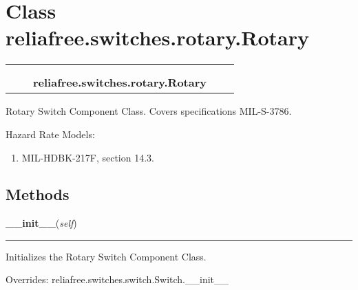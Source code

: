 %
%
%


\section{Class reliafree.switches.rotary.Rotary}

    \label{reliafree:switches:rotary:Rotary}
\begin{tabular}{cccccc}
\multicolumn{2}{r}{\settowidth{\BCL}{reliafree.switches.switch.Switch}\multirow{2}{\BCL}{reliafree.switches.switch.Switch}}
&&
  \\\cline{3-3}
  &&\multicolumn{1}{c|}{}
&&
  \\
&&\multicolumn{2}{l}{\textbf{reliafree.switches.rotary.Rotary}}
\end{tabular}

Rotary Switch Component Class. Covers specifications MIL-S-3786.

Hazard Rate Models:

\begin{enumerate}

\setlength{\parskip}{0.5ex}
  \item MIL-HDBK-217F, section 14.3.

\end{enumerate}



  \subsection{Methods}

    \vspace{0.5ex}

\hspace{.8\funcindent}\begin{boxedminipage}{\funcwidth}

    \raggedright \textbf{\_\_init\_\_}(\textit{self})

    \vspace{-1.5ex}

    \rule{\textwidth}{0.5\fboxrule}
\setlength{\parskip}{2ex}
    Initializes the Rotary Switch Component Class.

\setlength{\parskip}{1ex}
      Overrides: reliafree.switches.switch.Switch.\_\_init\_\_

    \end{boxedminipage}

